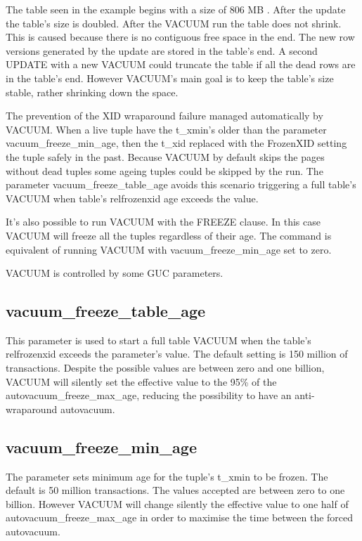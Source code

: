 The table seen in the example begins with a size of 806 MB . After the update the table's size is doubled.
After the VACUUM run the table does not shrink. This is caused because there is no contiguous free space in
the end. The new row versions generated by the update are stored in the table's end. A second UPDATE
with a new VACUUM could truncate the table if all the dead rows are in the table's end. However
VACUUM's main goal is to keep the table's size stable, rather shrinking down the space.\newline

The prevention of the XID wraparound failure managed automatically by VACUUM. When a live tuple have the
t\_xmin's older than the parameter vacuum\_freeze\_min\_age, then the t\_xid replaced with the
FrozenXID setting the tuple safely in the past. Because VACUUM by default skips the pages without dead
tuples some ageing tuples could be skipped by the run. The parameter vacuum\_freeze\_table\_age avoids
this scenario triggering a full table's VACUUM when table's relfrozenxid age exceeds the value.\newline

It's also possible to run VACUUM with the FREEZE  clause. In this case VACUUM
will freeze all the tuples regardless of their age. The command is equivalent of running VACUUM with
vacuum\_freeze\_min\_age set to zero.\newline

VACUUM is controlled by some GUC parameters.

\subsection{vacuum\_freeze\_table\_age}
This parameter is used to start a full table VACUUM when the table's relfrozenxid exceeds the parameter's
value. The default setting is 150 million of transactions. Despite the possible values are between zero
and one billion, VACUUM will silently set the effective value to the 95\% of
the autovacuum\_freeze\_max\_age, reducing the possibility to have an anti-wraparound autovacuum.

\subsection{vacuum\_freeze\_min\_age}
The parameter sets minimum age for the tuple's t\_xmin to be frozen. The default is 50 million
transactions. The values accepted are between zero to one billion. However VACUUM will change silently the
effective value to one half of autovacuum\_freeze\_max\_age in order to maximise the time between the
forced autovacuum.

